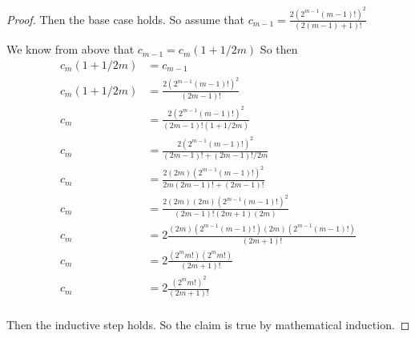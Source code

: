 \documentclass[11pt]{article}
\begin{document}
\begin{enumerate}[(a)]
\begin{proof}
        Then the base case holds. So assume that $c_{m-1} = \frac{2(2^{m-1}(m-1)!)^2}{(2(m-1) +1)!}$
        
        We know from above that $c_{m-1} = c_m (1 + 1/2m)$ So then
        \begin{align*}
            c_m (1 + 1/2m) &= c_{m-1}\\
            c_m (1 + 1/2m) &= \frac{2(2^{m-1}(m-1)!)^2}{(2m -1)!}\\
            c_m &= \frac{2(2^{m-1}(m-1)!)^2}{(2m -1)! (1 + 1/2m)}\\
            c_m &= \frac{2(2^{m-1}(m-1)!)^2}{(2m -1)! + (2m -1)!/2m}\\
            c_m &= \frac{2(2m)(2^{m-1}(m-1)!)^2}{2m(2m -1)! + (2m -1)!}\\
            c_m &= \frac{2(2m)(2m)(2^{m-1}(m-1)!)^2}{(2m -1)!(2m + 1)(2m)}\\
            c_m &= 2\frac{(2m)(2^{m-1}(m-1)!)(2m)(2^{m-1}(m-1)!)}{(2m + 1)!}\\
            c_m &= 2\frac{(2^{m}m!)(2^{m}m!)}{(2m + 1)!}\\
            c_m &= 2\frac{(2^{m}m!)^2}{(2m + 1)!}\\
        \end{align*}

        Then the inductive step holds. So the claim is true by mathematical induction.

    \end{proof}

\end{enumerate}
\end{document}
